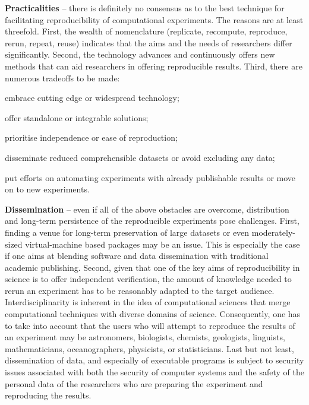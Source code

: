 {\bf Practicalities} -- there is definitely no consensus as to the
  best technique for facilitating reproducibility of computational
  experiments. 
The reasons are at least threefold. 
First, the wealth of nomenclature (replicate, recompute, reproduce, 
  rerun, repeat, reuse) indicates that the aims and the needs of researchers
  differ significantly.
Second, the technology advances and continuously offers new methods that can
  aid researchers in offering reproducible results.
Third, there are numerous tradeoffs to be made: 
  \begin{inparaenum}[(i)]
  \item embrace cutting edge or widespread technology; 
  \item offer standalone or integrable solutions; 
  \item prioritise independence or ease of reproduction; 
  \item disseminate reduced comprehensible datasets or avoid excluding any data;
  \item put efforts on automating experiments with already publishable results
  or move on to new experiments.
  \end{inparaenum}
    
{\bf Dissemination} -- even if all of the above obstacles are overcome, 
  distribution and long-term persistence of the reproducible experiments
  pose challenges.
First, finding a venue for long-term preservation of large datasets or even 
  moderately-sized virtual-machine based packages may be an issue.
This is especially the case if one aims at blending software and data
  dissemination with traditional academic publishing.
Second, given that one of the key aims of reproducibility in science
  is to offer independent verification, the amount of knowledge 
  needed to rerun an experiment has to be reasonably adapted to the
  target audience.
Interdisciplinarity is inherent in the idea of computational sciences that
  merge computational techniques with diverse domains of science.
Consequently, one has to take into account that the users who will attempt to
  reproduce the results of an experiment may be
  astronomers, biologists, chemists, geologists, linguists, mathematicians,
  oceanographers, physicists, or statisticians.
Last but not least, dissemination of data, and especially of executable
  programs is subject to security issues associated with both the security
  of computer systems and the safety of the personal data of the researchers who
  are preparing the experiment and reproducing the results.
